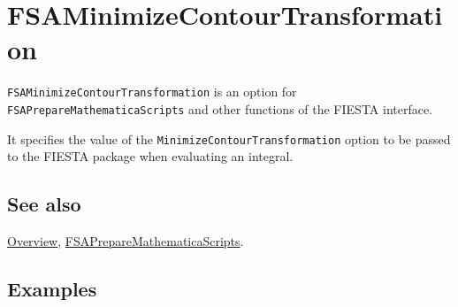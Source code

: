 \documentclass[../FeynHelpersManual.tex]{subfiles}
\begin{document}
\begin{Shaded}
\begin{Highlighting}[]
 
\end{Highlighting}
\end{Shaded}

\hypertarget{fsaminimizecontourtransformation}{
\section{FSAMinimizeContourTransformation}\label{fsaminimizecontourtransformation}}

\texttt{FSAMinimizeContourTransformation} is an option for
\texttt{FSAPrepareMathematicaScripts} and other functions of the FIESTA
interface.

It specifies the value of the \texttt{MinimizeContourTransformation}
option to be passed to the FIESTA package when evaluating an integral.

\subsection{See also}

\hyperlink{toc}{Overview},
\hyperlink{fsapreparemathematicascripts}{FSAPrepareMathematicaScripts}.

\subsection{Examples}
\end{document}
